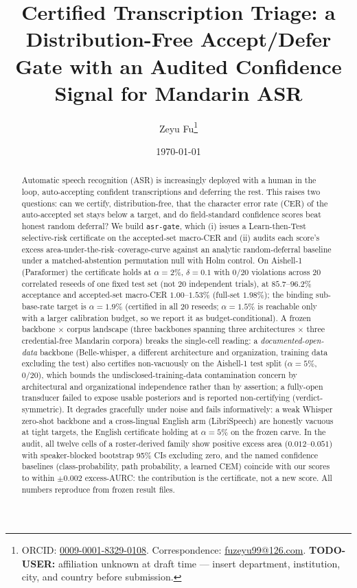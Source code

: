 \documentclass[11pt]{article}
\title{\textbf{Certified Transcription Triage: a Distribution-Free Accept/Defer
Gate with an Audited Confidence Signal for Mandarin ASR}}
\author{Zeyu Fu\thanks{ORCID: \href{https://orcid.org/0009-0001-8329-0108}{0009-0001-8329-0108}.
  Correspondence: \href{mailto:fuzeyu99@126.com}{fuzeyu99@126.com}.
  \textbf{TODO-USER:} affiliation unknown at draft time --- insert department,
  institution, city, and country before submission.}}
\affil{TODO-USER: Institution / Department, City, Country}
\date{\today}
\begin{document}
\maketitle

\begin{abstract}
\noindent Automatic speech recognition (ASR) is increasingly deployed with a human
in the loop, auto-accepting confident transcriptions and deferring the rest. This
raises two questions: can we certify, distribution-free, that the character
error rate (CER) of the auto-accepted set stays below a target, and do field-standard
confidence scores beat honest random deferral? We build \texttt{asr-gate}, which
(i) issues a Learn-then-Test selective-risk certificate on the accepted-set macro-CER
and (ii) audits each score's excess area-under-the-risk--coverage-curve against an
analytic random-deferral baseline under a matched-abstention permutation null with
Holm control. On Aishell-1 (Paraformer) the certificate holds at $\alpha=2\%$,
$\delta=0.1$ with 0/20 violations across 20 correlated reseeds of one fixed
test set (not 20 independent trials), at $85.7$--$96.2\%$ acceptance and accepted-set
macro-CER $1.00$--$1.53\%$ (full-set $1.98\%$); the binding sub-base-rate target is
$\alpha=1.9\%$ (certified in all 20 reseeds; $\alpha=1.5\%$ is reachable only with a
larger calibration budget, so we report it as budget-conditional). A frozen backbone
$\times$ corpus landscape (three backbones spanning three architectures $\times$ three
credential-free Mandarin corpora) breaks the single-cell reading: a
\emph{documented-open-data} backbone (Belle-whisper, a different architecture and
organization, training data excluding the test) also certifies non-vacuously on the
Aishell-1 test split ($\alpha=5\%$, 0/20), which bounds the undisclosed-training-data
contamination concern by architectural and organizational independence rather than by
assertion; a fully-open transducer failed to expose usable posteriors and is reported
non-certifying (verdict-symmetric). It degrades gracefully under noise and fails
informatively: a weak Whisper zero-shot backbone and a cross-lingual English arm
(LibriSpeech) are honestly vacuous at tight targets, the English certificate holding at
$\alpha=5\%$ on the frozen carve. In the audit, all twelve cells of a roster-derived
family show positive excess area ($0.012$--$0.051$) with speaker-blocked bootstrap 95\%
CIs excluding zero, and the named confidence baselines (class-probability, path
probability, a learned CEM) coincide with our scores to within $\pm0.002$ excess-AURC:
the contribution is the certificate, not a new score. All numbers reproduce from frozen
result files.
\end{abstract}
\end{document}
